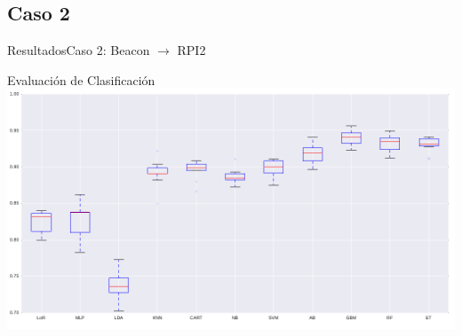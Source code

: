 \documentclass[10pt]{beamer}
\begin{document}
\subsection{Caso 2}
\begin{frame}{Resultados}{Caso 2: Beacon $\rightarrow$ RPI2}
\begin{block}{Evaluación de Clasificación}
\includegraphics[width=1.0\textwidth]{AAUgraphics/rasTx07Class}
\end{block}
\end{frame}
\end{document}
